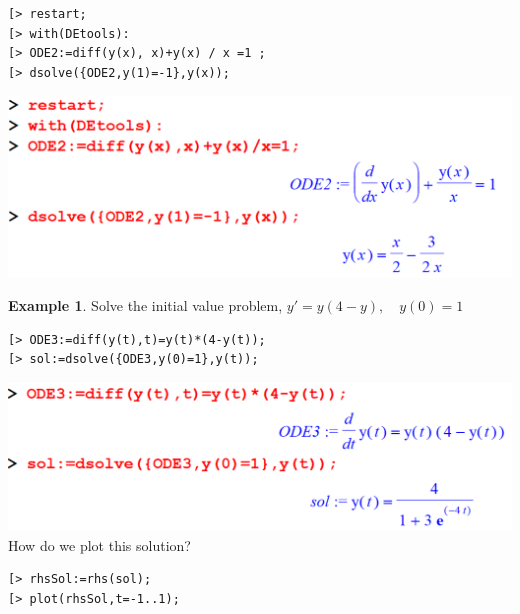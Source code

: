 \documentclass[
]{book}
\theoremstyle{definition}
\theoremstyle{definition}
\newtheorem{example}{Example}[chapter]
\theoremstyle{definition}
\theoremstyle{definition}
\theoremstyle{remark}
\begin{document}
\begin{verbatim}
[> restart;
[> with(DEtools):
[> ODE2:=diff(y(x), x)+y(x) / x =1 ;
[> dsolve({ODE2,y(1)=-1},y(x));
\end{verbatim}

\includegraphics{figures/Diff/Diff 6.2 -9.png}

\begin{example}
\protect\hypertarget{exm:unnamed-chunk-35}{}\label{exm:unnamed-chunk-35}Solve the initial value problem, \(y' = y(4 - y), \quad y(0) = 1\)
\end{example}

\begin{verbatim}
[> ODE3:=diff(y(t),t)=y(t)*(4-y(t));
[> sol:=dsolve({ODE3,y(0)=1},y(t));
\end{verbatim}

\includegraphics{figures/Diff/Diff 6.2 -10.png}
How do we plot this solution?

\begin{verbatim}
[> rhsSol:=rhs(sol);
[> plot(rhsSol,t=-1..1);
\end{verbatim}
\end{document}
